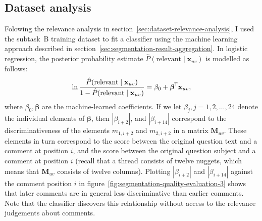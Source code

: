\documentclass[
  digital, %
  notable, %
  lof,     %
  lot,     %
  nopalatino, color
]{fithesis3}
\newcommand*{\tran}{^{\mkern-1.5mu\mathsf{T}}}
\begin{document}
\subsection{Dataset analysis}
\label{sec:segmentation-dataset-analysis}
Folowing the relevance analysis in section~\ref{sec:dataset-relevance-analysis},
I used the subtask~B training dataset to fit a classifier using the
machine learning approach described in section~\ref{sec:segmentation-result-aggregation}. In
logistic regression, the posterior probability estimate
$\hat P(\textrm{relevant}\mid\mathbf{x}_{uv})$ is modelled as follows:
\begin{equation}
  \ln\frac{\hat P(\textrm{relevant}\mid\mathbf{x}_{uv})}{1-\hat P(\textrm{relevant}\mid
  \mathbf{x}_{uv})}=\beta_0+\bm{\beta}\tran \mathbf{x}_{uv},
\end{equation}
where $\beta_0,\bm{\beta}$ are
the machine-learned coefficients. If we let
$\beta_j,j=1,2,\ldots,24$ denote the individual elements of $\bm{\beta}$, then
$|\beta_{i+2}|$, and $|\beta_{i+14}|$ correspond to
the discriminativeness of the elements $m_{1,i+2}$ and $m_{2,i+2}$ in a matrix
$\mathbf{M}_{uv}$. These elements in turn correspond to the score between the
original question text and a comment at position $i$, and the score between the
original question subject and a comment at position $i$ (recall that a thread
consists of twelve nuggets, which means that $\mathbf{M}_{uv}$ consists of
twelve columns). Plotting $|\beta_{i+2}|$ and $|\beta_{i+14}|$ against the
comment position $i$ in figure~\ref{fig:segmentation-quality-evaluation-3} shows that
later comments are in general less discriminative than earlier comments. Note
that the classifier discovers this relationship without access to the relevance
judgements about comments.
\end{document}
